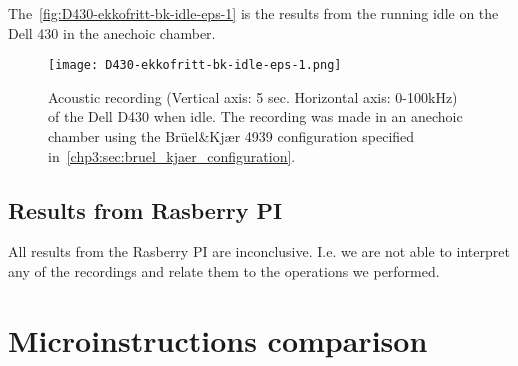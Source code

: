 The~\autoref{fig:D430-ekkofritt-bk-idle-eps-1} is the results from the running idle on the Dell 430 in the anechoic chamber. 
\begin{figure}[ht]
    \centering
    \texttt{[image: D430-ekkofritt-bk-idle-eps-1.png]}
    \caption{Acoustic recording (Vertical axis: 5 sec. Horizontal axis: 0-100kHz) of the Dell D430 when idle. The recording was made in an anechoic chamber using the Brüel\&Kjær 4939 configuration specified in~\autoref{chp3:sec:bruel_kjaer_configuration}. }
    \label{fig:D430-ekkofritt-bk-idle-eps-1}
\end{figure}

\subsection{Results from Rasberry PI}\label{chp5:subsec:rb_bk_results}
All results from the Rasberry PI are inconclusive. 
I.e. we are not able to interpret any of the recordings and relate them to the operations we performed.

\section{Microinstructions comparison}

